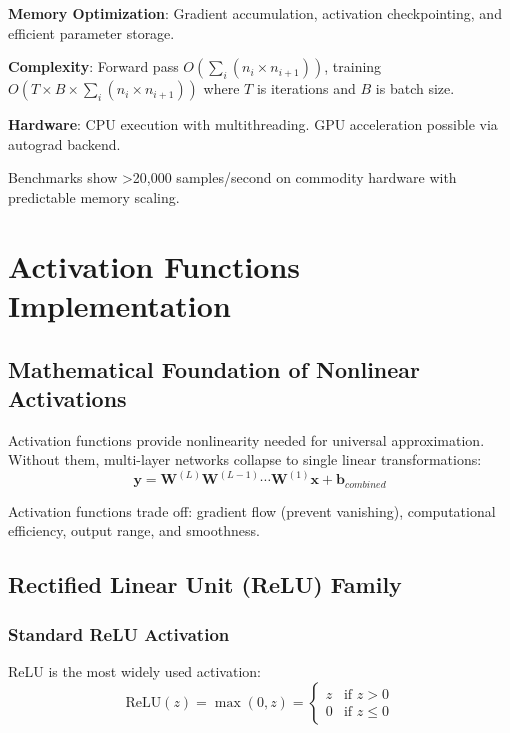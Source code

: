 \documentclass[11pt,a4paper]{report}
\begin{document}
\textbf{Memory Optimization}: Gradient accumulation, activation checkpointing, and efficient parameter storage.

\textbf{Complexity}: Forward pass $O(\sum_{i}(n_i \times n_{i+1}))$, training $O(T \times B \times \sum_{i}(n_i \times n_{i+1}))$ where $T$ is iterations and $B$ is batch size.

\textbf{Hardware}: CPU execution with multithreading. GPU acceleration possible via autograd backend.

Benchmarks show >20,000 samples/second on commodity hardware with predictable memory scaling.

\section{Activation Functions Implementation}

\subsection{Mathematical Foundation of Nonlinear Activations}

Activation functions provide nonlinearity needed for universal approximation. Without them, multi-layer networks collapse to single linear transformations:
\begin{equation}
\mathbf{y} = \mathbf{W}^{(L)} \mathbf{W}^{(L-1)} \cdots \mathbf{W}^{(1)} \mathbf{x} + \mathbf{b}_{combined}
\end{equation}

Activation functions trade off: gradient flow (prevent vanishing), computational efficiency, output range, and smoothness.

\subsection{Rectified Linear Unit (ReLU) Family}

\subsubsection{Standard ReLU Activation}

ReLU is the most widely used activation:
\begin{equation}
\text{ReLU}(z) = \max(0, z) = \begin{cases}
z & \text{if } z > 0 \\
0 & \text{if } z \leq 0
\end{cases}
\end{equation}
\end{document}
